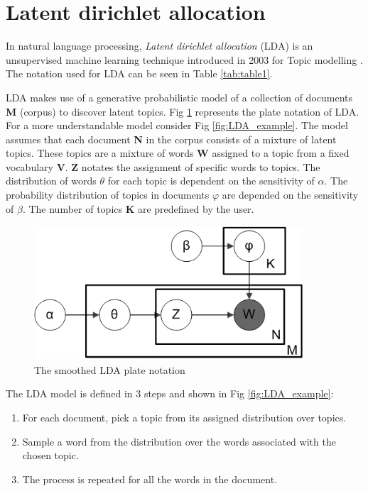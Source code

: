 \section{Latent dirichlet allocation}
In natural language processing, \textit{Latent dirichlet allocation} (LDA) is an unsupervised machine learning technique introduced in 2003 for Topic modelling \cite{Blei2003LatentAllocation}. The notation used for LDA can be seen in Table \ref{tab:table1}. 

LDA makes use of a generative probabilistic model of a collection of documents \textbf{M} (corpus) to discover latent topics. Fig \ref{fig:LDA} represents the plate notation of LDA. For a more understandable model consider Fig \ref{fig:LDA_example}. The model assumes that each document \textbf{N} in the corpus consists of a mixture of latent topics. These topics are a mixture of words \textbf{W} assigned to a topic from a fixed vocabulary \textbf{V}. \textbf{Z} notates the assignment of specific words to topics. The distribution of words $\theta$ for each topic is dependent on the sensitivity of $\alpha$. The probability distribution of topics in documents $\varphi$ are depended on the sensitivity of $\beta$. The number of topics \textbf{K} are predefined by the user. 

\begin{figure}
    \centering
    \includegraphics[width=10cm, height=5cm]{methodology/Smoothed_LDA.png}
    \caption{The smoothed LDA plate notation}
    \label{fig:LDA}
\end{figure}

The LDA model is defined in 3 steps and shown in Fig \ref{fig:LDA_example}:
\begin{enumerate}
    \item For each document, pick a topic from its assigned distribution over topics.
    \item Sample a word from the distribution over the words associated with the chosen topic. 
    \item  The process is repeated for all the words in the document.
\end{enumerate}

